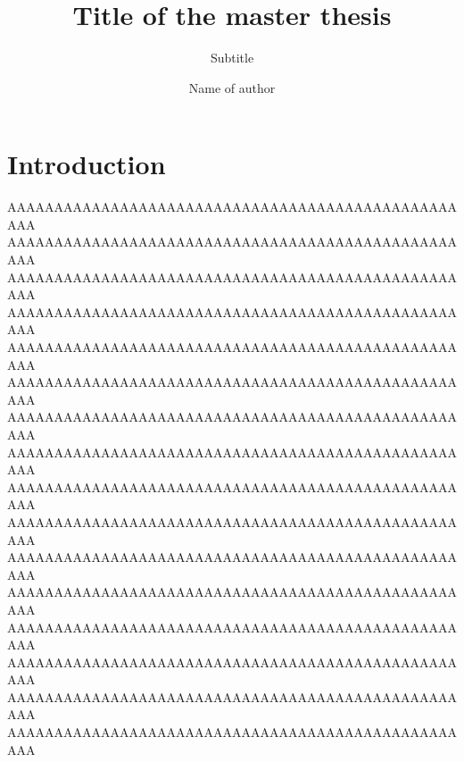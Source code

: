 \documentclass[final,11pt,baselinegrid]{../../uit-thesis}
\begin{document}

\title{Title of the master thesis}
\subtitle{Subtitle}			%
\author{Name of author}

\maketitle

\frontmatter

\tableofcontents

\mainmatter

\chapter{Introduction}
AAAAAAAAAAAAAAAAAAAAAAAAAAAAAAAAAAAAAAAAAAAAAAAAAAA\newline
AAAAAAAAAAAAAAAAAAAAAAAAAAAAAAAAAAAAAAAAAAAAAAAAAAA\newline
AAAAAAAAAAAAAAAAAAAAAAAAAAAAAAAAAAAAAAAAAAAAAAAAAAA\newline
AAAAAAAAAAAAAAAAAAAAAAAAAAAAAAAAAAAAAAAAAAAAAAAAAAA\newline
AAAAAAAAAAAAAAAAAAAAAAAAAAAAAAAAAAAAAAAAAAAAAAAAAAA\newline
AAAAAAAAAAAAAAAAAAAAAAAAAAAAAAAAAAAAAAAAAAAAAAAAAAA\newline
AAAAAAAAAAAAAAAAAAAAAAAAAAAAAAAAAAAAAAAAAAAAAAAAAAA\newline
AAAAAAAAAAAAAAAAAAAAAAAAAAAAAAAAAAAAAAAAAAAAAAAAAAA\newline
AAAAAAAAAAAAAAAAAAAAAAAAAAAAAAAAAAAAAAAAAAAAAAAAAAA\newline
AAAAAAAAAAAAAAAAAAAAAAAAAAAAAAAAAAAAAAAAAAAAAAAAAAA\newline
AAAAAAAAAAAAAAAAAAAAAAAAAAAAAAAAAAAAAAAAAAAAAAAAAAA\newline
AAAAAAAAAAAAAAAAAAAAAAAAAAAAAAAAAAAAAAAAAAAAAAAAAAA\newline
AAAAAAAAAAAAAAAAAAAAAAAAAAAAAAAAAAAAAAAAAAAAAAAAAAA\newline
AAAAAAAAAAAAAAAAAAAAAAAAAAAAAAAAAAAAAAAAAAAAAAAAAAA\newline
AAAAAAAAAAAAAAAAAAAAAAAAAAAAAAAAAAAAAAAAAAAAAAAAAAA\newline
AAAAAAAAAAAAAAAAAAAAAAAAAAAAAAAAAAAAAAAAAAAAAAAAAAA\newline
\end{document}
